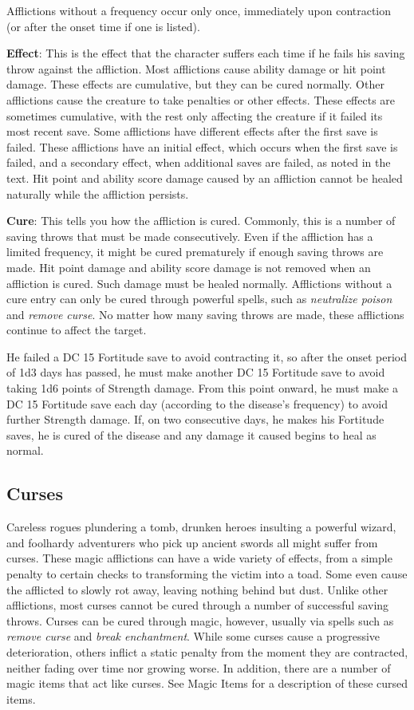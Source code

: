 Afflictions without a frequency occur only once, immediately upon contraction (or after the onset time if one is listed). 
				
\textbf{Effect}: This is the effect that the character suffers each time if he fails his saving throw against the affliction. Most afflictions cause ability damage or hit point damage. These effects are cumulative, but they can be cured normally. Other afflictions cause the creature to take penalties or other effects. These effects are sometimes cumulative, with the rest only affecting the creature if it failed its most recent save. Some afflictions have different effects after the first save is failed. These afflictions have an initial effect, which occurs when the first save is failed, and a secondary effect, when additional saves are failed, as noted in the text. Hit point and ability score damage caused by an affliction cannot be healed naturally while the affliction persists.
				
\textbf{Cure}: This tells you how the affliction is cured. Commonly, this is a number of saving throws that must be made consecutively. Even if the affliction has a limited frequency, it might be cured prematurely if enough saving throws are made. Hit point damage and ability score damage is not removed when an affliction is cured. Such damage must be healed normally. Afflictions without a cure entry can only be cured through powerful spells, such as \textit{neutralize poison} and \textit{remove curse}. No matter how many saving throws are made, these afflictions continue to affect the target. 
				
 He failed a DC 15 Fortitude save to avoid contracting it, so after the onset period of 1d3 days has passed, he must make another DC 15 Fortitude save to avoid taking 1d6 points of Strength damage. From this point onward, he must make a DC 15 Fortitude save each day (according to the disease's frequency) to avoid further Strength damage. If, on two consecutive days, he makes his Fortitude saves, he is cured of the disease and any damage it caused begins to heal as normal.
								
\subsection{Curses}

				
Careless rogues plundering a tomb, drunken heroes insulting a powerful wizard, and foolhardy adventurers who pick up ancient swords all might suffer from curses. These magic afflictions can have a wide variety of effects, from a simple penalty to certain checks to transforming the victim into a toad. Some even cause the afflicted to slowly rot away, leaving nothing behind but dust. Unlike other afflictions, most curses cannot be cured through a number of successful saving throws. Curses can be cured through magic, however, usually via spells such as \textit{remove curse} and \textit{break enchantment}. While some curses cause a progressive deterioration, others inflict a static penalty from the moment they are contracted, neither fading over time nor growing worse. In addition, there are a number of magic items that act like curses. See Magic Items for a description of these cursed items.
				
